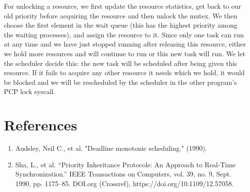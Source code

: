 \documentclass[12pt]{article}
\begin{document}
For unlocking a resource, we first update the resource statistics, get back to 
our old priority before acquiring the resource and then unlock the mutex. We 
then choose the first element in the wait queue (this has the highest priority
among the waiting processes), and assign the resource to it. Since only one 
task can run at any time and we have just stopped running after releasing this 
resource, either we hold more resources and will continue to run or this new 
task will run. We let the scheduler decide this: the new task will be scheduled
after being given this resource. If it fails to acquire any other resource it 
needs which we hold, it would be blocked and we will be rescheduled by the 
scheduler in the other program's PCP lock syscall.

\section{References}

\begin{enumerate}
    \item Audsley, Neil C., et al. "Deadline monotonic scheduling." (1990).
    \item Sha, L., et al. “Priority Inheritance Protocols: An Approach to Real-Time Synchronization.” IEEE Transactions on Computers, vol. 39, no. 9, Sept. 1990, pp. 1175–85. DOI.org (Crossref), https://doi.org/10.1109/12.57058.
\end{enumerate}
\end{document}
